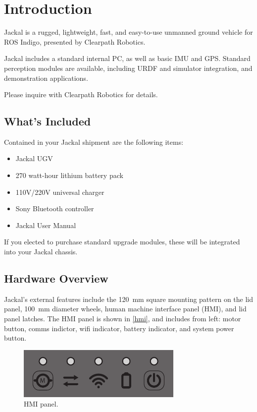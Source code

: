 \documentclass[]{clearpath-manual}
\begin{document}
\tableofcontents

\section{Introduction}

Jackal is a rugged, lightweight, fast, and easy-to-use unmanned ground vehicle for ROS
Indigo, presented by Clearpath Robotics.

Jackal includes a standard internal PC, as well as basic IMU and GPS. Standard
perception modules are available, including URDF and simulator integration, and
demonstration applications.

Please inquire with Clearpath Robotics for details.

\subsection{What's Included}

Contained in your Jackal shipment are the following items:

\begin{itemize}[nolistsep]
  \item Jackal UGV
  \item 270 watt-hour lithium battery pack
  \item 110V/220V universal charger
  \item Sony Bluetooth controller
  \item Jackal User Manual
\end{itemize}

If you elected to purchase standard upgrade modules, these will be integrated into your Jackal chassis.

\subsection{Hardware Overview}

Jackal's external features include the \SI{120}{\mm} square mounting pattern on the lid panel,
\SI{100}{\mm} diameter wheels, human machine interface panel (HMI), and lid panel latches. The
HMI panel is shown in \autoref{hmi}, and includes from left: motor button, comms indictor, wifi
indicator, battery indicator, and system power button.

\begin{figure}[ht]
  \centering
  \includegraphics[width=8.0cm]{hmi.pdf}
  \caption{HMI panel.}
  \label{hmi}
\end{figure}
\end{document}
